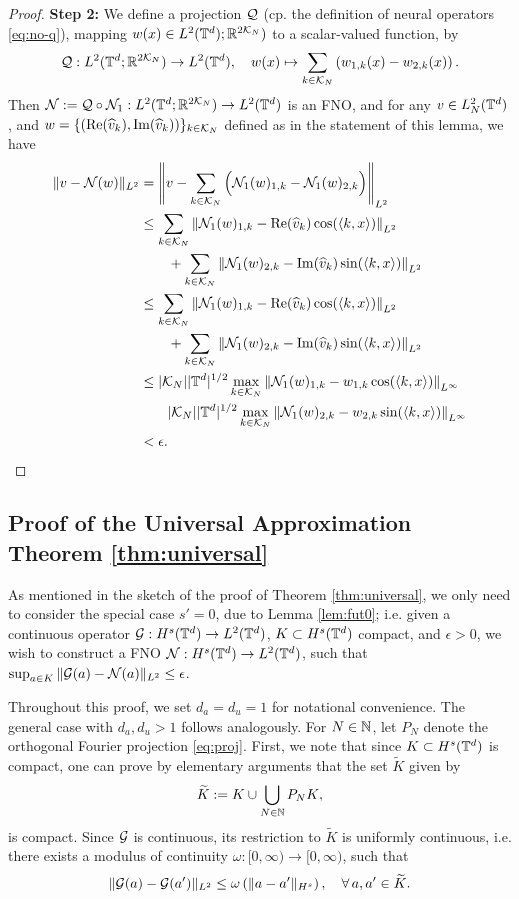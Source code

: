 \documentclass[reqno,a4paper]{amsart}
\begin{document}
\begin{proof}
\textbf{Step 2:} We define a projection $\mathcal{Q}$ (cp. the definition of neural operators \eqref{eq:no-q}), mapping $w(x) \in L^2(\mathbb{T}^d);\mathbb{R}^{2\mathcal{K}_N})$ to a scalar-valued function, by
\[
\mathcal{Q}: L^2(\mathbb{T}^d;\mathbb{R}^{2\mathcal{K}_N}) \to L^2(\mathbb{T}^d), \quad w(x) \mapsto \sum_{k\in \mathcal{K}_N} \left(w_{1,k}(x) - w_{2,k}(x)\right).
\]
Then $\mathcal{N} := \mathcal{Q} \circ \mathcal{N}_1: L^2(\mathbb{T}^d;\mathbb{R}^{2\mathcal{K}_N}) \to L^2(\mathbb{T}^d)$ is an FNO, and for any $v\in L^2_N(\mathbb{T}^d)$, and $w = \{(\mathrm{Re}(\widehat{v}_k),\mathrm{Im}(\widehat{v}_k))\}_{k\in \mathcal{K}_N}$ defined as in the statement of this lemma, we have
\begin{align*}
\Vert 
v - \mathcal{N}(w)
\Vert_{L^2}
&=
\left\Vert 
v - \sum_{k\in \mathcal{K}_N} \Big( 
\mathcal{N}_1(w)_{1,k}
- \mathcal{N}_1(w)_{2,k}
\Big)
\right\Vert_{L^2}
\\
&\le 
\sum_{k\in \mathcal{K}_N} 
\left\Vert 
\mathcal{N}_1(w)_{1,k} - \mathrm{Re}(\widehat{v}_k) \cos(\langle k,x \rangle)
\right\Vert_{L^2}
\\
&\qquad +
\sum_{k\in \mathcal{K}_N} 
\left\Vert 
\mathcal{N}_1(w)_{2,k} - \mathrm{Im}(\widehat{v}_k) \sin(\langle k,x \rangle) 
\right\Vert_{L^2}
\\
&\le 
\sum_{k\in \mathcal{K}_N} 
\left\Vert 
\mathcal{N}_1(w)_{1,k} - \mathrm{Re}(\widehat{v}_k) \cos(\langle k,x \rangle)
\right\Vert_{L^2}
\\
&\qquad +
\sum_{k\in \mathcal{K}_N} 
\left\Vert 
\mathcal{N}_1(w)_{2,k} - \mathrm{Im}(\widehat{v}_k) \sin(\langle k,x \rangle) 
\right\Vert_{L^2}
\\
&\le
|\mathcal{K}_N| |\mathbb{T}^d|^{1/2} 
\max_{k\in \mathcal{K}_N} \left\Vert \mathcal{N}_1(w)_{1,k} 
- 
w_{1,k}\cos(\langle k,x\rangle)
\right\Vert_{L^\infty}
\\
&\qquad
|\mathcal{K}_N| |\mathbb{T}^d|^{1/2} 
\max_{k\in \mathcal{K}_N} \left\Vert \mathcal{N}_1(w)_{2,k} 
- 
w_{2,k} \sin(\langle k,x\rangle)
\right\Vert_{L^\infty}
\\
&< \epsilon.
\end{align*}
\end{proof}

\subsection{Proof of the Universal Approximation Theorem \ref{thm:universal}}
\label{app:pfut}
As mentioned in the sketch of the proof of Theorem \ref{thm:universal}, we only need to consider the special case $s'=0$, due to Lemma \ref{lem:fut0}; i.e. given a continuous operator $\mathcal{G}: H^s(\mathbb{T}^d) \to L^2(\mathbb{T}^d)$, $K\subset H^s(\mathbb{T}^d)$ compact, and $\epsilon>0$, we wish to construct a FNO $\mathcal{N}: H^s(\mathbb{T}^d) \to L^2(\mathbb{T}^d)$, such that $\sup_{a\in K}\Vert \mathcal{G}(a) - \mathcal{N}(a) \Vert_{L^2} \le \epsilon$.

Throughout this proof, we set $d_a=d_u=1$ for notational convenience. The general case with $d_a, d_u > 1$ follows analogously. For $N\in \mathbb{N}$, let $P_N$ denote the orthogonal Fourier projection \eqref{eq:proj}. First, we note that since $K\subset H^{s}(\mathbb{T}^d)$ is compact, one can prove by elementary arguments that the set $\tilde{K}$ given by
\[ 
\widetilde{K} 
:= 
K \cup {\bigcup_{N\in \mathbb{N}} P_N K},
\]
is compact. Since $\mathcal{G}$ is continuous, its restriction to $\tilde{K}$ is uniformly continuous, i.e. there exists a modulus of continuity $\omega: [0,\infty) \to [0,\infty)$, such that 
\[
\Vert \mathcal{G}(a) - \mathcal{G}(a') \Vert_{L^2} 
\le 
\omega
\left(
\Vert a - a' \Vert_{H^{s}}
\right), 
\quad \forall \, a, a' \in \widetilde{K}.
\]
\end{document}

